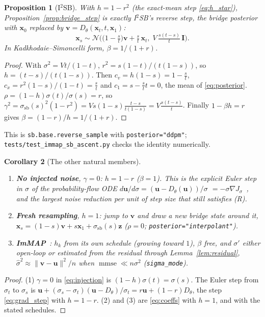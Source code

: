 \documentclass[11pt]{article}
\newtheorem{proposition}{Proposition}
\newtheorem{corollary}[proposition]{Corollary}
\theoremstyle{definition}
\theoremstyle{remark}
\newcommand{\x}{\bm{x}}
\newcommand{\uu}{\bm{u}}
\newcommand{\vv}{\bm{v}}
\newcommand{\zz}{\bm{z}}
\newcommand{\N}{\mathcal{N}}
\newcommand{\Id}{\bm{I}}
\newcommand{\D}{D_\theta}
\newcommand{\ssb}{\sigma_{\mathrm{sb}}}
\newcommand{\grad}{\nabla}
\newcommand{\mmse}{\operatorname{mmse}}
\newcommand{\code}[1]{\texttt{#1}}
\begin{document}
\begin{proposition}[I$^2$SB]\label{prop:i2sb}
With $h = 1-r^2$ (the exact-mean step \eqref{eq:h_star}), Proposition~\ref{prop:bridge_step}
is exactly I$^2$SB's reverse step, the bridge posterior with $\x_0$ replaced by
$\vv = \D(\x_t,t,\x_1)$:
\begin{equation}
  \x_s \sim \N\!\Big(\big(1-\tfrac{s}{t}\big)\vv + \tfrac{s}{t}\,\x_t,\;
  V\,\tfrac{s(t-s)}{t}\,\Id\Big).
  \label{eq:posterior}
\end{equation}
In Kadkhodaie--Simoncelli form, $\beta = 1/(1+r)$.
\end{proposition}
\begin{proof}
With $\sigma^2 = Vt/(1-t)$, $r^2 = s(1-t)/(t(1-s))$, so $h = (t-s)/(t(1-s))$. Then
$c_v = h(1-s) = 1-\tfrac st$, $c_x = r^2(1-s)/(1-t) = \tfrac st$ and $c_1 = s - \tfrac st t = 0$,
the mean of \eqref{eq:posterior}. $\rho = (1-h)\sigma(t)/\sigma(s) = r$, so
$\gamma^2 = \ssb(s)^2(1-r^2) = Vs(1-s)\tfrac{t-s}{t(1-s)} = V\tfrac{s(t-s)}{t}$. Finally
$1-\beta h = r$ gives $\beta = (1-r)/h = 1/(1+r)$.
\end{proof}

This is \code{sb.base.reverse\_sample} with \code{posterior="ddpm"};
\code{tests/test\_immap\_sb\_ascent.py} checks the identity numerically.

\begin{corollary}[The other natural members]\label{cor:family}
\begin{enumerate}[leftmargin=1.8em]
  \item \textbf{No injected noise}, $\gamma = 0$: $h = 1-r$ ($\beta=1$). This is the explicit
        Euler step in $\sigma$ of the probability-flow ODE $d\uu/d\sigma = (\uu - \D(\uu))/\sigma$
        $= -\sigma\grad J_\sigma$~\cite{song2021}, and the largest noise reduction per unit of
        step size that still satisfies (R).
  \item \textbf{Fresh resampling}, $h=1$: jump to $\vv$ and draw a new bridge state around it,
        $\x_s = (1-s)\vv + s\x_1 + \ssb(s)\zz$ ($\rho=0$; \code{posterior="interpolant"}).
  \item \textbf{ImMAP}~\cite{ks2021}: $h_k$ from its own schedule (growing toward $1$), $\beta$
        free, and $\sigma'$ either open-loop or estimated from the residual through
        Lemma~\ref{lem:residual}, $\hat\sigma^2 \approx \|\vv-\uu\|^2/n$ when
        $\mmse\ll n\sigma^2$ (\code{sigma\_mode}).
\end{enumerate}
\end{corollary}
\begin{proof}
(1) $\gamma=0$ in \eqref{eq:injection} is $(1-h)\sigma(t) = \sigma(s)$. The Euler step from
$\sigma_t$ to $\sigma_s$ is $\uu + (\sigma_s-\sigma_t)(\uu-\D)/\sigma_t = r\uu + (1-r)\D$, the
step \eqref{eq:grad_step} with $h=1-r$. (2) and (3) are \eqref{eq:coeffs} with $h=1$, and with
the stated schedules.
\end{proof}
\end{document}
